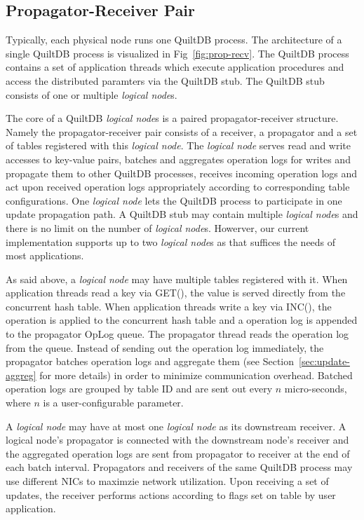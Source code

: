 \documentclass[11pt, twocolumn]{article}
\begin{document}
\subsection{Propagator-Receiver Pair}

Typically, each physical node runs one QuiltDB process. The architecture of a single
QuiltDB process is visualized in Fig~\ref{fig:prop-recv}.  The QuiltDB process
contains a set of application threads which execute application procedures and
access the distributed paramters via the QuiltDB stub. The QuiltDB stub consists 
of one or multiple \emph{logical node}s.

The core of a QuiltDB \emph{logical node}s is a paired propagator-receiver
structure. Namely the propagator-receiver pair consists
of a receiver, a propagator and a set of tables registered with this
\emph{logical node}. The \emph{logical node} serves read and write accesses to
key-value pairs, batches and aggregates operation logs for writes and propagate
them to other QuiltDB processes, receives incoming operation logs and act upon
received operation logs appropriately according to corresponding table
configurations. One \emph{logical node} lets the QuiltDB process to participate
in one update propagation path. A QuiltDB stub may contain multiple
\emph{logical node}s and there is no limit on the number of \emph{logical
node}s. Howerver, our current implementation supports up to two \emph{logical
node}s as that suffices the needs of most applications.

As said above, a \emph{logical node} may have multiple tables registered with it.
When application threads read a key via GET(), the value is served directly from
the concurrent hash table. When application threads write a key via INC(), the
operation is applied to the concurrent hash table and a operation log is
appended to the propagator OpLog queue. The propagator thread reads the
operation log from the queue. Instead of sending out the operation log
immediately, the propagator batches operation logs and aggregate them (see
Section~\ref{sec:update-aggreg} for more details) in order to minimize
communication overhead. Batched operation logs are grouped by table ID and are
sent out every $n$ micro-seconds, where $n$ is a user-configurable parameter.

A \emph{logical node} may have at most one \emph{logical node} as its downstream
receiver. A logical node's propagator is connected with the downstream node's
receiver and the aggregated operation logs are sent from propagator to receiver
at the end of each batch interval. Propagators and receivers of the same QuiltDB
process may use different NICs to maximzie network utilization. Upon receiving
a set of updates, the receiver performs actions according to flags set on table
by user application.
\end{document}
